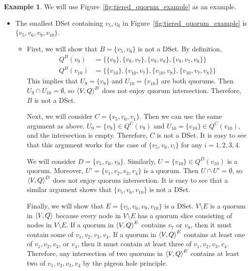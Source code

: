 \documentclass[12pt, psamsfonts]{amsart}
\theoremstyle{definition}
\newtheorem{exmp}[thm]{Example}
\theoremstyle{remark}
\numberwithin{equation}{section}
\begin{document}
\begin{exmp}
    We will use Figure~\ref{fig:tiered_quorum_example} as an example.

    \begin{itemize}
        \item
            The smallest DSet containing $v_5, v_6$ in Figure~\ref{fig:tiered_quorum_example} is $\{ v_5, v_6, v_9, v_{10} \}$.
            \begin{itemize}
                \item
                    First, we will show that $B = \{ v_5, v_6 \}$ is not a DSet.
                    By definition,
                    \begin{align*}
                        Q^B(v_9) &= \{ \{ v_9 \}, \{ v_9, v_7 \}, \{ v_9, v_8 \}, \{ v_9, v_7, v_8 \} \} \\
                        Q^B(v_{10}) &= \{ \{ v_{10} \}, \{ v_{10}, v_7 \}, \{ v_{10}, v_8 \}, \{ v_{10}, v_7, v_8 \} \}
                    \end{align*}
                    This implies that $U_9 = \{ v_9 \}$ and $U_{10} = \{ v_{10} \}$ are both quorums.
                    Then $U_9 \cap U_{10} = \emptyset$, so $\ev{V, Q}^B$ does not enjoy quorum intersection.
                    Therefore, $B$ is not a DSet.

                    Next, we will consider $C = \{ v_5, v_6, v_1 \}$.
                    Then we can use the same argument as above.
                    $U_9 = \{ v_9 \} \in Q^C(v_9)$ and $U_{10} = \{ v_{10} \} \in Q^C(v_{10})$, and the intersection is empty.
                    Therefore, $C$ is not a DSet.
                    It is easy to see that this argument works for the case of $\{ v_5, v_6, v_i \}$ for any $i = 1, 2, 3, 4$.

                    We will consider $D = \{ v_5, v_6, v_9 \}$.
                    Similarly, $U = \{ v_{10} \} \in Q^D(v_{10})$ is a quorum.
                    Moreover, $U' = \{ v_1, v_2, v_3, v_4 \}$ is a quorum.
                    Then $U \cap U' = \emptyset$, so $\ev{V, Q}^D$ does not enjoy quorum intersection.
                    It is easy to see that a similar argument shows that $\{ v_5, v_6, v_{10} \}$ is not a DSet.

                    Finally, we will show that $E = \{ v_5, v_6, v_9, v_{10} \}$ is a DSet.
                    $V \setminus E$ is a quorum in $\ev{V, Q}$ because every node in $V \setminus E$ has a quorum slice consisting of nodes in $V \setminus E$.
                    If a quorum in $\ev{V, Q}^E$ contains $v_7$ or $v_8$, then it must contain some of $v_1, v_2, v_3, v_4$.
                    If a quorum in $\ev{V, Q}^E$ contains at least one of $v_1, v_2, v_3$, or $v_4$, then it must contain at least three of $v_1, v_2, v_3, v_4$.
                    Therefore, any intersection of two quorums in $\ev{V, Q}^E$ contains at least two of $v_1, v_2, v_3, v_4$ by the pigeon hole principle.


\end{itemize}
\end{itemize}
\end{exmp}
\end{document}
